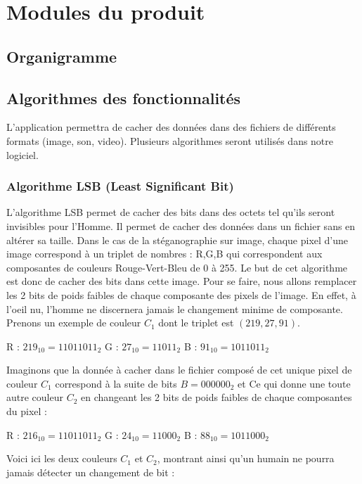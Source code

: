 \documentclass[11pt]{article}
\begin{document}
\section{Modules du produit}

\subsection{Organigramme}

\subsection{Algorithmes des fonctionnalités}

L'application permettra de cacher des données dans des fichiers de différents formats (image, son, video). 
Plusieurs algorithmes seront utilisés dans notre logiciel.

\subsubsection{Algorithme LSB (Least Significant Bit)}

L'algorithme LSB permet de cacher des bits dans des octets tel qu'ils seront invisibles pour l'Homme. 
Il permet de cacher des données dans un fichier sans en altérer sa taille. 
Dans le cas de la stéganographie sur image, chaque pixel d'une image correspond à un triplet de nombres : R,G,B qui correspondent aux composantes de couleurs Rouge-Vert-Bleu de 0 à 255. 
Le but de cet algorithme est donc de cacher des bits dans cette image. Pour se faire, nous allons remplacer les 2 bits de poids faibles de chaque composante des pixels de l'image. 
En effet, à l'oeil nu, l'homme ne discernera jamais le changement minime de composante. 
Prenons un exemple de couleur $C_1$ dont le triplet est $(219,27,91)$. 

R : $219_{10} = 11011011_2$	\qquad G : $27_{10} = 11011_2$ \qquad B : $91_{10} = 1011011_2$


Imaginons que la donnée à cacher dans le fichier composé de cet unique pixel de couleur $C_1$ correspond à la suite de bits $B = 000000_2$ et
Ce qui donne une toute autre couleur $C_2$ en changeant les 2 bits de poids faibles de chaque composantes du pixel : 

R : $216_{10} = 11011011_2$ \qquad G : $24_{10} = 11000_2$ \qquad B : $88_{10} = 1011000_2$


Voici ici les deux couleurs $C_1$ et $C_2$, montrant ainsi qu'un humain ne pourra jamais détecter un changement de bit : 
\end{document}
